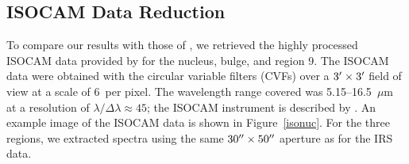 \subsection{ISOCAM Data Reduction}
\label{sect:iso_data}

To compare our results with those of  \citet{1998Cesarsky}, we retrieved the highly processed ISOCAM data provided by \citet{Boulanger_F_2005}  
for the nucleus, bulge, and region 9. 
The ISOCAM data were obtained with the circular variable filters (CVFs) over a $3\hbox{$^\prime$} \times 3\hbox{$^\prime$}$ field of view at a scale of 6\arcsec\ per pixel. 
The wavelength range covered was 5.15--16.5~$\mu$m at a resolution of $\lambda/\Delta \lambda \approx 45$; the ISOCAM instrument is described by \citet{cesarsky1996}.
An example image of the ISOCAM data is shown in Figure~\ref{isonuc}.  For the three regions, we extracted spectra using the same 
$30\hbox{$^{\prime\prime}$}\times50\hbox{$^{\prime\prime}$}$ aperture as for the IRS data. 





